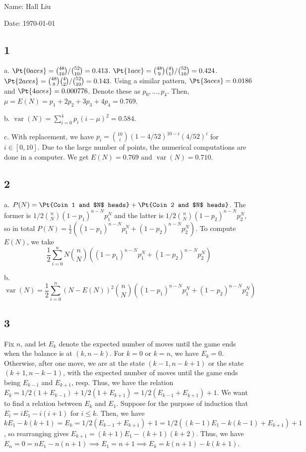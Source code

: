\documentclass{article}
\DeclareMathOperator{\var}{var}
\begin{document}
Name: Hall Liu

Date: \today 
\vspace{1.5cm}

\subsection*{1}
a. $\Pt{0 aces}=\binom{48}{10}/\binom{52}{10}=0.413$. $\Pt{1 ace}=\binom{48}{9}\binom{4}{1}/\binom{52}{10}=0.424$. $\Pt{2 aces}=\binom{48}{8}\binom{4}{2}/\binom{52}{10}=0.143$. Using a similar pattern, $\Pt{3 aces}=0.0186$ and $\Pt{4 aces}=0.000776$. Denote these as $p_0,\ldots,p_4$. Then, $\mu=E(N)=p_1+2p_2+3p_3+4p_4=0.769$.

b. $\var(N)=\sum_{i=0}^4p_i(i-\mu)^2=0.584$.

c. With replacement, we have $p_i=\binom{10}{i}(1-4/52)^{10-i}(4/52)^i$ for $i\in[0,10]$. Due to the large number of points, the numerical computations are done in a computer. We get $E(N)=0.769$ and $\var(N)=0.710$.
\subsection*{2}
a. $P(N)=\Pt{Coin 1 and $N$ heads}+\Pt{Coin 2 and $N$ heads}$. The former is $1/2\binom{n}{N}(1-p_1)^{n-N}p_1^N$ and the latter is $1/2\binom{n}{N}(1-p_2)^{n-N}p_2^N$, so in total $P(N)=\frac{1}{2}((1-p_1)^{n-N}p_1^N+(1-p_2)^{n-N}p_2^N)$. To compute $E(N)$, we take 
$$\frac{1}{2}\sum_{i=0}^nN\binom{n}{N}((1-p_1)^{n-N}p_1^N+(1-p_2)^{n-N}p_2^N)$$

b. $$\var(N)=\frac{1}{2}\sum_{i=0}^n(N-E(N))^2\binom{n}{N}((1-p_1)^{n-N}p_1^N+(1-p_2)^{n-N}p_2^N)$$
\subsection*{3}
Fix $n$, and let $E_k$ denote the expected number of moves until the game ends when the balance is at $(k,n-k)$. For $k=0$ or $k=n$, we have $E_k=0$. Otherwise, after one move, we are at the state $(k-1,n-k+1)$ or the state $(k+1,n-k-1)$, with the expected number of moves until the game ends being $E_{k-1}$ and $E_{k+1}$, resp. Thus, we have the relation $E_k=1/2(1+E_{k-1})+1/2(1+E_{k+1})=1/2(E_{k-1}+E_{k+1})+1$. We want to find a relation between $E_k$ and $E_1$. Suppose for the purpose of induction that $E_i=iE_1-i(i+1)$ for $i\leq k$. Then, we have $kE_1-k(k+1)=E_k=1/2(E_{k-1}+E_{k+1})+1=1/2((k-1)E_1-k(k-1)+E_{k+1})+1$, so rearranging gives $E_{k+1}=(k+1)E_1-(k+1)(k+2)$. Thus, we have $E_n=0=nE_1-n(n+1)\implies E_1=n+1\implies E_k=k(n+1)-k(k+1)$.
\end{document}
